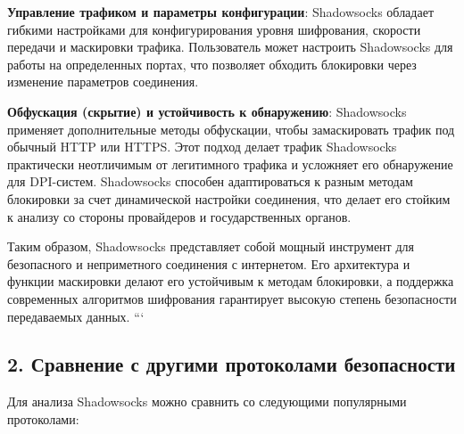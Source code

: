 \documentclass{SCWorks}
\begin{document}
\textbf{Управление трафиком и параметры конфигурации}: Shadowsocks обладает гибкими настройками для конфигурирования уровня шифрования, скорости передачи и маскировки трафика. Пользователь может настроить Shadowsocks для работы на определенных портах, что позволяет обходить блокировки через изменение параметров соединения.

\textbf{Обфускация (скрытие) и устойчивость к обнаружению}: Shadowsocks применяет дополнительные методы обфускации, чтобы замаскировать трафик под обычный HTTP или HTTPS. Этот подход делает трафик Shadowsocks практически неотличимым от легитимного трафика и усложняет его обнаружение для DPI-систем. Shadowsocks способен адаптироваться к разным методам блокировки за счет динамической настройки соединения, что делает его стойким к анализу со стороны провайдеров и государственных органов.

Таким образом, Shadowsocks представляет собой мощный инструмент для безопасного и неприметного соединения с интернетом. Его архитектура и функции маскировки делают его устойчивым к методам блокировки, а поддержка современных алгоритмов шифрования гарантирует высокую степень безопасности передаваемых данных.
```
\subsection*{2. Сравнение с другими протоколами безопасности}

Для анализа Shadowsocks можно сравнить со следующими популярными протоколами:
\end{document}
